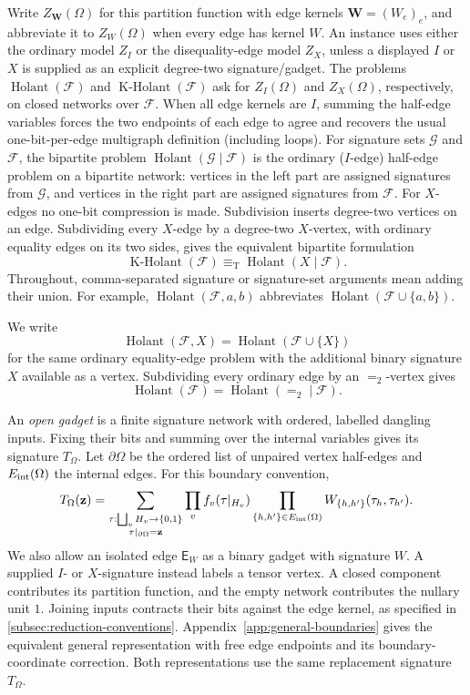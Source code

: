 \documentclass[11pt,letterpaper,onecolumn]{article}
\theoremstyle{plain}
\theoremstyle{definition}
\theoremstyle{remark}
\newcommand{\cF}{\mathcal F}
\newcommand{\cG}{\mathcal G}
\newcommand{\Holant}{\operatorname{Holant}}
\newcommand{\KHolant}{\operatorname{K\text{-}Holant}}
\newcommand{\Eq}{=}
\newcommand{\equivT}{\equiv_{\mathrm T}}
\begin{document}
Write \(Z_{\mathbf W}(\Omega)\) for this partition function with edge kernels
\(\mathbf W=(W_e)_e\), and abbreviate it to \(Z_W(\Omega)\) when every
edge has kernel \(W\).
An instance uses either the ordinary model \(Z_I\) or the
disequality-edge model \(Z_X\),
unless a displayed \(I\) or \(X\) is supplied as an explicit degree-two
signature/gadget.  The problems \(\Holant(\cF)\) and \(\KHolant(\cF)\) ask for
\(Z_I(\Omega)\) and \(Z_X(\Omega)\), respectively, on closed networks
over \(\cF\). When all edge kernels are \(I\), summing the
half-edge variables forces the two endpoints of each edge to agree and
recovers the usual one-bit-per-edge multigraph definition (including loops).
For signature sets \(\cG\) and \(\cF\), the bipartite problem
\(\Holant(\cG\mid\cF)\) is the ordinary (\(I\)-edge) half-edge problem on a
bipartite network: vertices in the left part are assigned signatures from
\(\cG\), and vertices in the right part are assigned signatures from
\(\cF\).  For \(X\)-edges no one-bit compression is made.  Subdivision inserts degree-two vertices on an edge.
Subdividing every \(X\)-edge by a degree-two \(X\)-vertex, with ordinary equality edges on its
two sides, gives the equivalent bipartite formulation
\begin{equation*}
  \KHolant(\cF)\equivT\Holant(X\mid\cF).
\end{equation*}
Throughout, comma-separated signature or signature-set arguments mean
adding their union. For example, \(\Holant(\cF,a,b)\) abbreviates
\(\Holant(\cF\cup\{a,b\})\).

We write
\[
  \Holant(\cF,X)=\Holant(\cF\cup\{X\})
\]
for the same ordinary equality-edge problem with the additional binary
signature \(X\) available as a vertex.
Subdividing every ordinary edge by an \(\Eq_2\)-vertex gives
\[
  \Holant(\cF)=\Holant(\Eq_2\mid\cF).
\]


An \emph{open gadget} is a finite signature network with ordered, labelled
dangling inputs. Fixing their bits and summing over the internal variables
gives its signature \(T_\Omega\). Let \(\partial\Omega\) be the ordered list
of unpaired vertex half-edges and \(E_{\rm int}(\Omega)\) the internal edges.
For this boundary convention,
\[
 T_\Omega({\mathbf z})=
 \sum_{\substack{\tau:\bigsqcup_v H_v\to\{0,1\}\\
                 \tau|_{\partial\Omega}={\mathbf z}}}
 \prod_v f_v(\tau|_{H_v})
 \prod_{\{h,h'\}\in E_{\rm int}(\Omega)}W_{\{h,h'\}}(\tau_h,\tau_{h'}).
\]
We also allow an isolated edge \(\mathsf E_W\) as a binary gadget with
signature \(W\). A supplied \(I\)- or \(X\)-signature instead labels a
tensor vertex. A closed component contributes its partition function,
and the empty network contributes the nullary unit \(1\).
Joining inputs contracts their bits against the edge kernel, as specified
in \cref{subsec:reduction-conventions}.
Appendix~\ref{app:general-boundaries} gives the equivalent general
representation with free edge endpoints and its boundary-coordinate
correction. Both representations use the same replacement signature
\(T_\Omega\).
\end{document}
